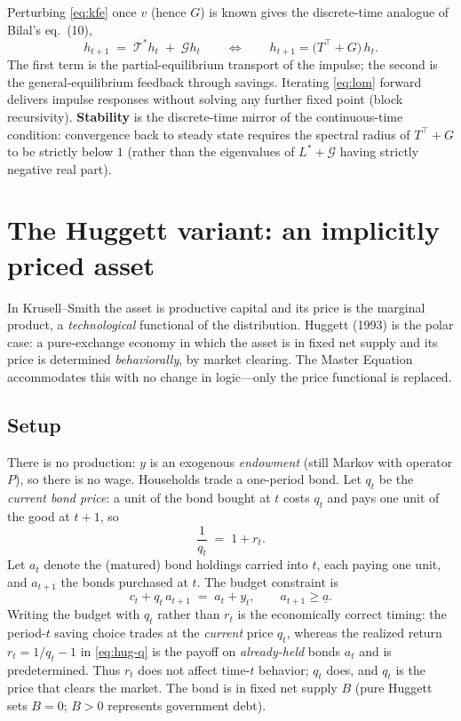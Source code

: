 \documentclass[11pt]{article}
\newcommand{\Tstar}{\mathcal{T}^{*}}
\newcommand{\Gop}{\mathcal{G}}
\begin{document}
Perturbing \eqref{eq:kfe} once $v$ (hence $G$) is known gives the discrete-time
analogue of Bilal's eq.~(10),
\begin{equation}\label{eq:lom}
  h_{t+1}\;=\;\Tstar h_t \;+\; \Gop h_t
  \qquad\Longleftrightarrow\qquad
  h_{t+1}=\big(T^{\top}+G\big)\,h_t .
\end{equation}
The first term is the partial-equilibrium transport of the impulse; the second is the
general-equilibrium feedback through savings. Iterating \eqref{eq:lom} forward
delivers impulse responses without solving any further fixed point (block
recursivity). \textbf{Stability} is the discrete-time mirror of the continuous-time
condition: convergence back to steady state requires the spectral radius of
$T^{\top}+G$ to be strictly below $1$ (rather than the eigenvalues of $L^{*}+\Gop$
having strictly negative real part).

\section{The Huggett variant: an implicitly priced asset}\label{sec:huggett}

In Krusell--Smith the asset is productive capital and its price is the marginal
product, a \emph{technological} functional of the distribution. Huggett (1993) is the
polar case: a pure-exchange economy in which the asset is in fixed net supply and its
price is determined \emph{behaviorally}, by market clearing. The Master Equation
accommodates this with no change in logic---only the price functional is replaced.

\subsection{Setup}

There is no production: $y$ is an exogenous \emph{endowment} (still Markov with
operator $P$), so there is no wage. Households trade a one-period bond. Let $q_t$ be
the \emph{current bond price}: a unit of the bond bought at $t$ costs $q_t$ and pays
one unit of the good at $t+1$, so
\begin{equation}\label{eq:hug-q}
  \frac{1}{q_t}\;=\;1+r_t .
\end{equation}
Let $a_t$ denote the (matured) bond holdings carried into $t$, each paying one unit,
and $a_{t+1}$ the bonds purchased at $t$. The budget constraint is
\begin{equation}\label{eq:hug-budget}
  c_t + q_t\,a_{t+1} \;=\; a_t + y_t, \qquad a_{t+1}\ge \underline a .
\end{equation}
Writing the budget with $q_t$ rather than $r_t$ is the economically correct timing:
the period-$t$ saving choice trades at the \emph{current} price $q_t$, whereas the
realized return $r_t=1/q_t-1$ in \eqref{eq:hug-q} is the payoff on \emph{already-held}
bonds $a_t$ and is predetermined. Thus $r_t$ does not affect time-$t$ behavior; $q_t$
does, and $q_t$ is the price that clears the market. The bond is in fixed net supply
$B$ (pure Huggett sets $B=0$; $B>0$ represents government debt).
\end{document}
